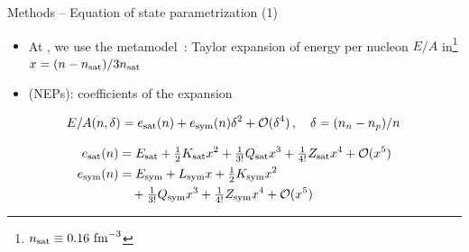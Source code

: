\documentclass[usenames,dvipsnames,t]{beamer}
\begin{document}
\begin{frame}{Methods -- Equation of state parametrization (1)}

  \def\x{3mm}
    
  \begin{itemize}
    \item At , we use the metamodel~\cite{Margueron:2017eqc,Margueron:2017lup}: Taylor expansion of energy per nucleon $E/A$ in\footnote{$n_{\rm{sat}} \equiv 0.16 \ \rm{fm}^{-3}$} $x = (n - n_{\rm{sat}}) / 3n_{\rm{sat}}$

    \vspace{\x}

    \item {} (NEPs): coefficients of the expansion
  \end{itemize}

  \vspace{\x}

  \begin{equation*}
    E/A(n, \delta) = e_{\rm{sat}}(n) + e_{\rm{sym}}(n) \delta^2  + \mathcal{O}(\delta^4) \, , \quad \delta = (n_n - n_p) / n \,
  \end{equation*}

  \begin{align*}
    e_{\rm{sat}}(n) &= E_{\rm{sat}} + \tfrac12 K_{\rm{sat}} x^2 + \tfrac{1}{3!} Q_{\rm{sat}} x^3 + \tfrac{1}{4!} Z_{\rm{sat}} x^4 + \mathcal{O}(x^5) \\
    e_{\rm{sym}}(n) &= E_{\rm{sym}} + L_{\rm{sym}} x + \tfrac12 K_{\rm{sym}} x^2  \\
    & \quad + \tfrac{1}{3!} Q_{\rm{sym}} x^3 + \tfrac{1}{4!} Z_{\rm{sym}} x^4 + \mathcal{O}(x^5)
  \end{align*}

\end{frame}
\end{document}
